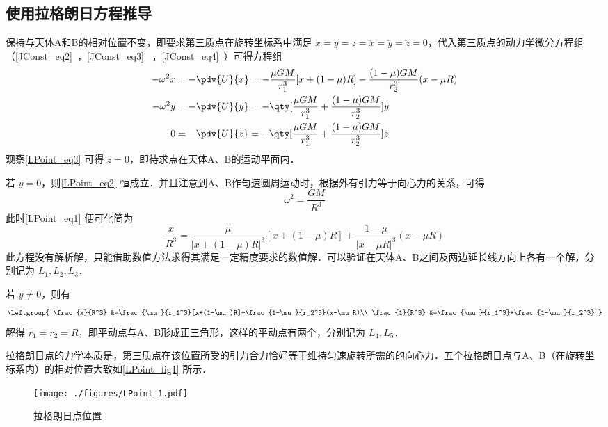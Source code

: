 

\subsection{使用拉格朗日方程推导}

保持与天体A和B的相对位置不变，即要求第三质点在旋转坐标系中满足 $\dot{x}=\dot{y}=\dot{z}=\ddot{x}=\ddot{y}=\ddot{z}=0$，代入第三质点的动力学微分方程组（\autoref{JConst_eq2}~，\autoref{JConst_eq3}~ ，\autoref{JConst_eq4}~）可得方程组
\begin{align}
-\omega^2 x &=- \pdv{U}{x}=-\frac{\mu GM}{r_1^3}[x+(1-\mu)R]-\frac{(1-\mu)GM}{r_2^3}(x-\mu R)\label{LPoint_eq1}\\
-\omega^2 y &=- \pdv{U}{y}=-\qty[\frac{\mu GM}{r_1^3}+\frac{(1-\mu)GM}{r_2^3}]y\label{LPoint_eq2}\\
0 &=- \pdv{U}{z} =-\qty[\frac{\mu GM}{r_1^3}+\frac{(1-\mu)GM}{r_2^3}]z\label{LPoint_eq3}
\end{align}
观察\autoref{LPoint_eq3} 可得 $z=0$，即待求点在天体A、B的运动平面内．

若 $y=0$，则\autoref{LPoint_eq2} 恒成立．并且注意到A、B作匀速圆周运动时，根据外有引力等于向心力的关系，可得
\begin{equation}%
\omega^2 =\frac{GM}{R^3}
\end{equation}
此时\autoref{LPoint_eq1} 便可化简为
\begin{equation}%
\frac{x}{R^3} =\frac{\mu}{|x+(1-\mu)R|^3}[x+(1-\mu)R]+\frac{1-\mu}{|x-\mu R|^3}(x-\mu R)
\end{equation}
此方程没有解析解，只能借助数值方法求得其满足一定精度要求的数值解．可以验证在天体A、B之间及两边延长线方向上各有一个解，分别记为 $L_1,L_2,L_3$．

若 $y\neq 0$，则有
\begin{equation}%
\leftgroup{
\frac{x}{R^3} &=\frac{\mu}{r_1^3}[x+(1-\mu)R]+\frac{1-\mu}{r_2^3}(x-\mu R)\\
\frac{1}{R^3} &=\frac{\mu}{r_1^3}+\frac{1-\mu}{r_2^3}
}
\end{equation}
解得 $r_1=r_2=R$，即平动点与A、B形成正三角形，这样的平动点有两个，分别记为 $L_4,L_5$．

拉格朗日点的力学本质是，第三质点在该位置所受的引力合力恰好等于维持匀速旋转所需的的向心力．五个拉格朗日点与A、B（在旋转坐标系内）的相对位置大致如\autoref{LPoint_fig1} 所示．
\begin{figure}[ht]
\centering
\texttt{[image: ./figures/LPoint\_1.pdf]}
\caption{拉格朗日点位置} \label{LPoint_fig1}
\end{figure}
